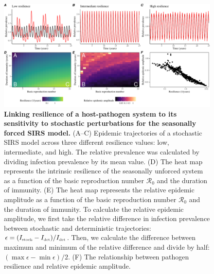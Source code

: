 \documentclass[12pt]{article}
\newcommand{\tsub}[2]{#1_{{\textrm{\tiny #2}}}}
\begin{document}
\begin{figure}[!th]
\begin{center}
\includegraphics[width=\textwidth]{../figure6/figure_persistence_noise_cycle.pdf}
\caption{
\textbf{Linking resilience of a host-pathogen system to its sensitivity to stochastic perturbations for the seasonally forced SIRS model.}
(A--C) Epidemic trajectories of a stochastic SIRS model across three different resilience values: low, intermediate, and high.
The relative prevalence was calculated by dividing infection prevalence by its mean value.
(D) The heat map represents the intrinsic resilience of the seasonally unforced system as a function of the basic reproduction number $\mathcal R_0$ and the duration of immunity.
(E) The heat map represents the relative epidemic amplitude as a function of the basic reproduction number $\mathcal R_0$ and the duration of immunity.
To calculate the relative epidemic amplitude, we first take the relative difference in infection prevalence between stochastic and deterministic trajectories: $\epsilon = (\tsub{I}{stoch}-\tsub{I}{det})/\tsub{I}{det}$. 
Then, we calculate the difference between maximum and minimum of the relative difference and divide by half: $(\max \epsilon - \min \epsilon)/2$.
(F) The relationship between pathogen resilience and relative epidemic amplitude.
}
\end{center}
\end{figure}


\pagebreak


\end{document}
